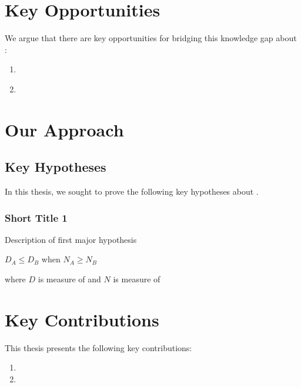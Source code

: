 

\section{Key Opportunities} \label{th:KeyOpportunities} %
We argue that there are  key opportunities for bridging this knowledge gap about :
\begin{enumerate}
	\item {} \\
	
	\item {} \\
	
\end{enumerate}


\section{Our Approach}

\subsection{Key Hypotheses} \label{th:KeyHypotheses}
In this thesis, we sought to prove the following key hypotheses about .

\subsubsection*{Short Title 1}
\begin{hypothesis} \label{hyp:Thesis:OverallHypothesisA}
	Description of first major hypothesis

	\begin{center}
	  $D_A \leq D_B$ when $N_A \geq N_B$ 
	\end{center}

	where $D$ is measure of  and $N$ is measure of 
\end{hypothesis}



\section{Key Contributions} \label{th:KeyContributions}
This thesis presents the following key contributions:
\begin{enumerate}
	\item {}
	\item {}
\end{enumerate}



